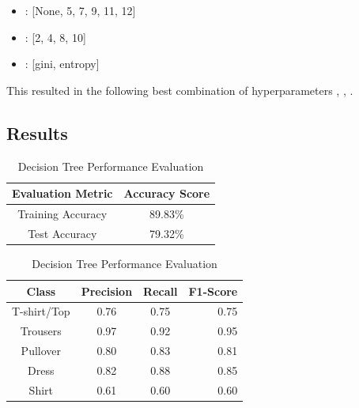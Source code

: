 \begin{center} \begin{minipage}{4in}

\begin{itemize}
    \item {}: [None, 5, 7, 9, 11, 12]
    \item {}: [2, 4, 8, 10]
    \item {}: [gini, entropy] \\
\end{itemize}
            \end{minipage}
\end{center}

This resulted in the following best combination of hyperparameters , , .

\subsection{Results}


\begin{table}[!ht]
\begin{subtable}[c]{0.4\textwidth}
\footnotesize
\centering
\begin{tabular}{ c | c }
 \toprule
 Evaluation Metric & Accuracy Score  \\
 \midrule
 Training Accuracy &  89.83\% \\
 Test Accuracy &79.32\% \\
 \bottomrule
\end{tabular}
\captionsetup{justification=centering,margin=1cm}
\end{subtable}
\begin{subtable}[c]{0.6\textwidth}
\footnotesize
\centering
\begin{tabular}{c | c c r}
Class & Precision & Recall & F1-Score\\
\midrule
T-shirt/Top   &    0.76  &    0.75  &    0.75 \\
Trousers   &    0.97  &    0.92  &    0.95 \\
Pullover   &    0.80  &    0.83  &    0.81\\
Dress   &    0.82  &    0.88  &    0.85\\
Shirt   &    0.61  &    0.60  &    0.60\\
\end{tabular}
\captionsetup{justification=centering,margin=1cm}
\end{subtable}
\caption{Decision Tree Performance Evaluation}
\label{dt_evaluation}
\end{table}\\

